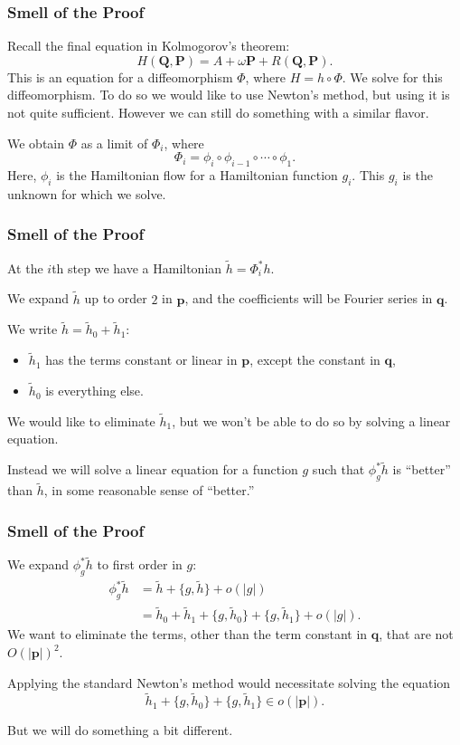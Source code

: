 \documentclass{beamer}
\newcommand{\bp}[1]{\bm{#1}}
\begin{document}
\begin{frame}
  \frametitle{Smell of the Proof}
  Recall the final equation in Kolmogorov's theorem:
  \begin{equation*}
    H(\bp{Q}, \bp{P}) = A + \omega \bp{P} + R (\bp{Q}, \bp{P}).
  \end{equation*}
  This is an equation for a diffeomorphism $\Phi$, where $H = h \circ \Phi$.
  We solve for this diffeomorphism.
  To do so we would like to use Newton's method, but using it is not quite
  sufficient.
  However we can still do something with a similar flavor.

  We obtain $\Phi$ as a limit of $\Phi_i$, where
  \begin{equation*}
    \Phi_i = \phi_i \circ \phi_{i-1} \circ \cdots \circ \phi_1.
  \end{equation*}
  Here, $\phi_i$ is the Hamiltonian flow for a Hamiltonian function $g_i$.
  This $g_i$ is the unknown for which we solve.
\end{frame}

\begin{frame}
  \frametitle{Smell of the Proof}
  At the $i$th step we have a Hamiltonian $\tilde{h} = \Phi_i^* h$.

  We expand $\tilde{h}$ up to order $2$ in $\bp{p}$, and the coefficients will
  be Fourier series in $\bp{q}$.

  We write $\tilde{h} = \tilde{h}_0 + \tilde{h}_1$:
  \begin{itemize}
  \item $\tilde{h}_1$ has the terms constant or linear in $\bp{p}$, except the
    constant in $\bp{q}$,
  \item $\tilde{h}_0$ is everything else.
  \end{itemize}
 
  We would like to eliminate $\tilde{h}_1$, but we won't be able to do so by
  solving a linear equation.

  Instead we will solve a linear equation for a function $g$ such that $\phi^*_g
  \tilde{h}$ is ``better'' than $\tilde{h}$, in some reasonable sense of
  ``better.''
\end{frame}

\begin{frame}
  \frametitle{Smell of the Proof}
  We expand $\phi^*_g \tilde{h}$ to first order in $g$:
  \begin{align*}
    \phi^*_g \tilde{h} &= \tilde{h} + \{g, \tilde{h}\} + o(|g|)\\
    &= \tilde{h}_0 + \tilde{h}_1 + \{g, \tilde{h}_0\} + \{g, \tilde{h}_1\} +
      o(|g|).
  \end{align*}
  We want to eliminate the terms, other than the term constant in $\bp{q}$, that
  are not $O(|\bp{p}|)^2$.

  Applying the standard Newton's method would necessitate solving the equation
  \begin{equation*}
    \tilde{h}_1 + \{g, \tilde{h}_0\} + \{g, \tilde{h}_1\} \in o(|\bp{p}|).
  \end{equation*}

  But we will do something a bit different.
\end{frame}
\end{document}
